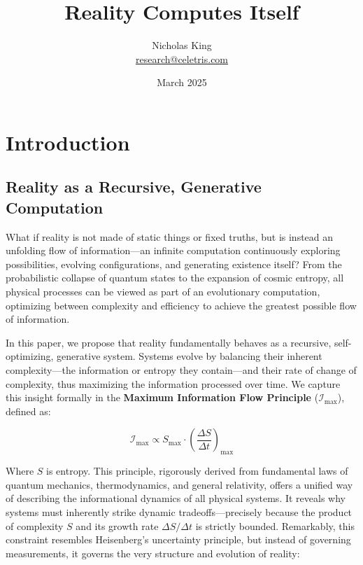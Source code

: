 \documentclass[12pt]{article}
\begin{document}
\title{Reality Computes Itself}
\author{Nicholas King \\ \href{mailto:research@celetris.com}{research@celetris.com}}
\date{March 2025}

\maketitle

\section{Introduction}

\subsection{Reality as a Recursive, Generative Computation}

What if reality is not made of static things or fixed truths, but is instead an unfolding flow of information—an infinite computation continuously exploring possibilities, evolving configurations, and generating existence itself? From the probabilistic collapse of quantum states to the expansion of cosmic entropy, all physical processes can be viewed as part of an evolutionary computation, optimizing between complexity and efficiency to achieve the greatest possible flow of information.

In this paper, we propose that reality fundamentally behaves as a recursive, self-optimizing, generative system. Systems evolve by balancing their inherent complexity—the information or entropy they contain—and their rate of change of complexity, thus maximizing the information processed over time. We capture this insight formally in the \textbf{Maximum Information Flow Principle} ($\mathcal{I}_{\text{max}}$), defined as:

\begin{equation}
    \mathcal{I}_{\text{max}} \propto S_{\text{max}} \cdot \left(\frac{\Delta S}{\Delta t}\right)_{\text{max}}
\end{equation}

Where $S$ is entropy. This principle, rigorously derived from fundamental laws of quantum mechanics, thermodynamics, and general relativity, offers a unified way of describing the informational dynamics of all physical systems. It reveals why systems must inherently strike dynamic tradeoffs—precisely because the product of complexity \( S \) and its growth rate \(\Delta S / \Delta t\) is strictly bounded. Remarkably, this constraint resembles Heisenberg's uncertainty principle, but instead of governing measurements, it governs the very structure and evolution of reality:
\end{document}
